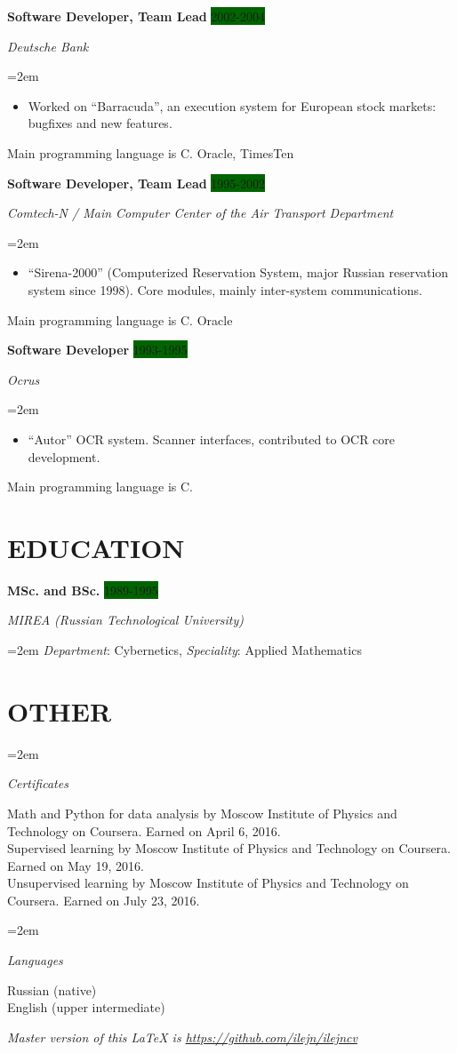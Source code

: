 \documentclass[paper=a4,fontsize=10pt]{scrartcl} %
\newlength{\entrybox}
\newcommand{\sepspace}{\vspace*{1em}}       %
\newcommand{\ProgrammingLanguage}[1]{        %
        Main programming language is #1.}
\newcommand{\NewPart}[1]{\section*{\uppercase{#1}}}
\newcommand{\SkillsEntry}[2]{\pagebreak[2]
        \noindent\hangindent=2em\hangafter=0 %
        \parbox[t]{\entrybox}{     %
        \textit{#1}}               %
        \hspace{1.5em} \parbox[t]{\dimexpr\textwidth-\entrybox-1.5em-\hangindent-1em\relax}{#2} \par\sepspace}    %
\newcommand{\EducationEntry}[4]{\pagebreak[2]
        \noindent \textbf{#1} \hfill      %
        \colorbox{DarkGreen}{\color{White}#2} \par  %
        \noindent \textit{#3} \par        %
        \noindent\hangindent=2em\hangafter=0 \small #4 %
        \normalsize \par \sepspace}
\newcommand{\WorkEntry}[4]{\pagebreak[2]    %
        \noindent \textbf{#1} \hfill      %
        \colorbox{DarkGreen}{\color{White}#2} \par  %
        \noindent \textit{#3} \par        %
        \noindent\hangindent=2em\hangafter=0 \small #4 %
        \normalsize \par \sepspace}
\newcommand{\BottomLine}[1]{
        \vfill\centering\textit{#1}\par
        }
\begin{document}
\WorkEntry{Software Developer, Team Lead}{2002-2004}{Deutsche Bank}{
\begin{itemize}\itemsep0em
\item Worked on ``Barracuda'', an execution system for European stock markets: bugfixes and new features.
\end{itemize}
\ProgrammingLanguage{C} Oracle, TimesTen
}

\WorkEntry{Software Developer, Team Lead}{1995-2002}{Comtech-N / Main Computer Center of the Air Transport Department}{
\begin{itemize}\itemsep0em
\item ``Sirena-2000'' (Computerized Reservation System, major Russian reservation system since 1998). Core modules, mainly inter-system communications.
\end{itemize}
\ProgrammingLanguage{C} Oracle
}

\WorkEntry{Software Developer}{1993-1995}{Ocrus}{
\begin{itemize}\itemsep0em
\item ``Autor'' OCR system. Scanner interfaces, contributed to OCR core development.
\end{itemize}
\ProgrammingLanguage{C}
}


\NewPart{Education}

\EducationEntry{MSc. and BSc.}{1989-1995}{MIREA (Russian Technological University)}{\textit{Department}: Cybernetics, \textit{Speciality}: Applied Mathematics}

\NewPart{Other}


\SkillsEntry{Certificates}{Math and Python for data analysis by Moscow Institute of Physics and Technology on Coursera. Earned on April 6, 2016. \\
  Supervised learning by Moscow Institute of Physics and Technology on Coursera. Earned on May 19, 2016. \\
  Unsupervised learning by Moscow Institute of Physics and Technology on Coursera. Earned on July 23, 2016.}

\SkillsEntry{Languages}{Russian (native)  \\
   English (upper intermediate)}


\BottomLine{Master version of this \LaTeX{} is \url{https://github.com/ilejn/ilejncv}}
\end{document}
